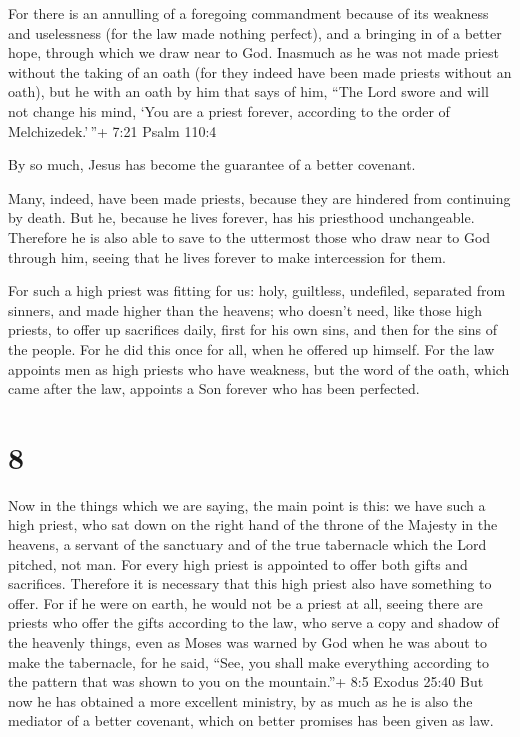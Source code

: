  For there is an annulling of a foregoing commandment
because of its weakness and uselessness  (for the law made
nothing perfect), and a bringing in of a better hope, through which we
draw near to God.  Inasmuch as he was not made priest
without the taking of an oath  (for they indeed have been
made priests without an oath), but he with an oath by him that says of
him, ``The Lord swore and will not change his mind, `You are a priest
forever, according to the order of Melchizedek.'\,''+ 7:21 Psalm 110:4

 By so much, Jesus has become the guarantee of a better
covenant.

 Many, indeed, have been made priests, because they are
hindered from continuing by death.  But he, because he
lives forever, has his priesthood unchangeable.  Therefore
he is also able to save to the uttermost those who draw near to God
through him, seeing that he lives forever to make intercession for them.

 For such a high priest was fitting for us: holy,
guiltless, undefiled, separated from sinners, and made higher than the
heavens;  who doesn't need, like those high priests, to
offer up sacrifices daily, first for his own sins, and then for the sins
of the people. For he did this once for all, when he offered up himself.
 For the law appoints men as high priests who have
weakness, but the word of the oath, which came after the law, appoints a
Son forever who has been perfected.

\hypertarget{section-7}{%
\section{8}\label{section-7}}

 Now in the things which we are saying, the main point is
this: we have such a high priest, who sat down on the right hand of the
throne of the Majesty in the heavens,  a servant of the
sanctuary and of the true tabernacle which the Lord pitched, not man.
 For every high priest is appointed to offer both gifts and
sacrifices. Therefore it is necessary that this high priest also have
something to offer.  For if he were on earth, he would not
be a priest at all, seeing there are priests who offer the gifts
according to the law,  who serve a copy and shadow of the
heavenly things, even as Moses was warned by God when he was about to
make the tabernacle, for he said, ``See, you shall make everything
according to the pattern that was shown to you on the mountain.''+ 8:5
Exodus 25:40  But now he has obtained a more excellent
ministry, by as much as he is also the mediator of a better covenant,
which on better promises has been given as law.

